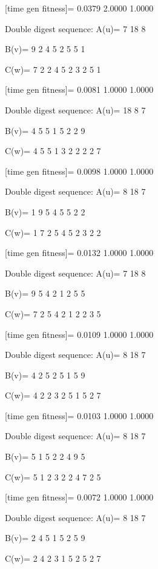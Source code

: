 [time gen fitness]=
    0.0379    2.0000    1.0000

Double digest sequence:
A(u)=
     7    18     8

B(v)=
     9     2     4     5     2     5     5     1

C(w)=
     7     2     2     4     5     2     3     2     5     1

[time gen fitness]=
    0.0081    1.0000    1.0000

Double digest sequence:
A(u)=
    18     8     7

B(v)=
     4     5     5     1     5     2     2     9

C(w)=
     4     5     5     1     3     2     2     2     2     7

[time gen fitness]=
    0.0098    1.0000    1.0000

Double digest sequence:
A(u)=
     8    18     7

B(v)=
     1     9     5     4     5     5     2     2

C(w)=
     1     7     2     5     4     5     2     3     2     2

[time gen fitness]=
    0.0132    1.0000    1.0000

Double digest sequence:
A(u)=
     7    18     8

B(v)=
     9     5     4     2     1     2     5     5

C(w)=
     7     2     5     4     2     1     2     2     3     5

[time gen fitness]=
    0.0109    1.0000    1.0000

Double digest sequence:
A(u)=
     8    18     7

B(v)=
     4     2     5     2     5     1     5     9

C(w)=
     4     2     2     3     2     5     1     5     2     7

[time gen fitness]=
    0.0103    1.0000    1.0000

Double digest sequence:
A(u)=
     8    18     7

B(v)=
     5     1     5     2     2     4     9     5

C(w)=
     5     1     2     3     2     2     4     7     2     5

[time gen fitness]=
    0.0072    1.0000    1.0000

Double digest sequence:
A(u)=
     8    18     7

B(v)=
     2     4     5     1     5     2     5     9

C(w)=
     2     4     2     3     1     5     2     5     2     7

